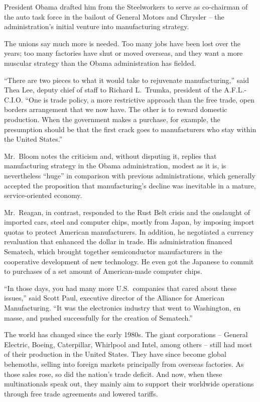 ﻿\documentclass[12pt]{article}
\begin{document}
President Obama drafted him from the Steelworkers to serve as co-chairman of the auto task force in
the bailout of General Motors and Chrysler -- the administration's initial venture into
manufacturing strategy.

The unions say much more is needed. Too many jobs have been lost over the years; too many factories
have shut or moved overseas, and they want a more muscular strategy than the Obama administration
has fielded.

``There are two pieces to what it would take to rejuvenate manufacturing,'' said Thea Lee, deputy
chief of staff to Richard L.~Trumka, president of the A.F.L.-C.I.O. ``One is trade policy, a more
restrictive approach than the free trade, open borders arrangement that we now have. The other is to
reward domestic production. When the government makes a purchase, for example, the presumption
should be that the first crack goes to manufacturers who stay within the United States.''

Mr.~Bloom notes the criticism and, without disputing it, replies that manufacturing strategy in the
Obama administration, modest as it is, is nevertheless ``huge'' in comparison with previous
administrations, which generally accepted the proposition that manufacturing's decline was
inevitable in a mature, service-oriented economy.

Mr.~Reagan, in contrast, responded to the Rust Belt crisis and the onslaught of imported cars, steel
and computer chips, mostly from Japan, by imposing import quotas to protect American manufacturers.
In addition, he negotiated a currency revaluation that enhanced the dollar in trade. His
administration financed Sematech, which brought together semiconductor manufacturers in the
cooperative development of new technology. He even got the Japanese to commit to purchases of a set
amount of American-made computer chips.

``In those days, you had many more U.S.~companies that cared about these issues,'' said Scott Paul,
executive director of the Alliance for American Manufacturing. ``It was the electronics industry
that went to Washington, en masse, and pushed successfully for the creation of Sematech.''

The world has changed since the early 1980s. The giant corporations -- General Electric, Boeing,
Caterpillar, Whirlpool and Intel, among others -- still had most of their production in the United
States. They have since become global behemoths, selling into foreign markets principally from
overseas factories. As those sales rose, so did the nation's trade deficit. And now, when these
multinationals speak out, they mainly aim to support their worldwide operations through free trade
agreements and lowered tariffs.
\end{document}
